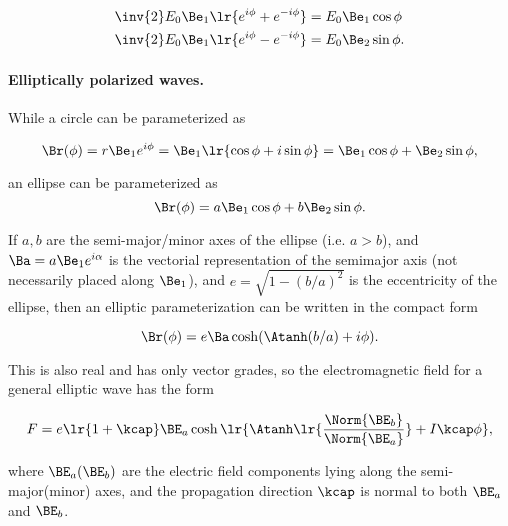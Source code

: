 \begin{dmath}\label{eqn:ellipticalWaves:300}
\begin{aligned}
   \inv{2} E_0 \Be_1 \lr{ e^{i \phi} + e^{-i\phi} } &= E_0 \Be_1 \cos\phi \\
   \inv{2} E_0 \Be_1 \lr{ e^{i \phi} - e^{-i\phi} } &= E_0 \Be_2 \sin\phi.
\end{aligned}
\end{dmath}

\paragraph{Elliptically polarized waves.}

While a circle can be parameterized as

\begin{dmath}\label{eqn:ellipticalWaves:320}
\Br(\phi)
=
r \Be_1 e^{i \phi}
=
\Be_1 \lr{ \cos\phi + i \sin\phi }
=
\Be_1 \cos\phi + \Be_2 \sin\phi,
\end{dmath}

an ellipse can be parameterized as
\begin{dmath}\label{eqn:ellipticalWaves:340}
\Br(\phi)
=
a \Be_1 \cos\phi + b \Be_2 \sin\phi.
\end{dmath}

If \( a, b \) are the semi-major/minor axes of the ellipse (i.e. \( a > b \)),
and \( \Ba = a \Be_1 e^{i\alpha} \) is the vectorial representation of the semimajor axis (not necessarily placed along \( \Be_1 \)),
and \( e = \sqrt{1 - (b/a)^2} \) is the eccentricity of the ellipse,
then an elliptic parameterization can be written
\citep{hestenes1999nfc}
in the compact form

\begin{dmath}\label{eqn:ellipticalWaves:360}
\Br(\phi)
=
e \Ba \cosh( \Atanh(b/a) + i \phi).
\end{dmath}

This is also real and has only vector grades, so the electromagnetic field for a general elliptic wave has the form

\begin{dmath}\label{eqn:ellipticalWaves:380}
F
=
e \lr{ 1 + \kcap } \BE_a
\cosh\lr{ \Atanh\lr{ \frac{\Norm{\BE_b}}{\Norm{\BE_a}}} + I \kcap \phi},
\end{dmath}

where \( \BE_a(\BE_b) \) are the electric field components lying along the semi-major(minor) axes, and the propagation direction \( \kcap \) is normal to both \( \BE_a \) and \(\BE_b\).

